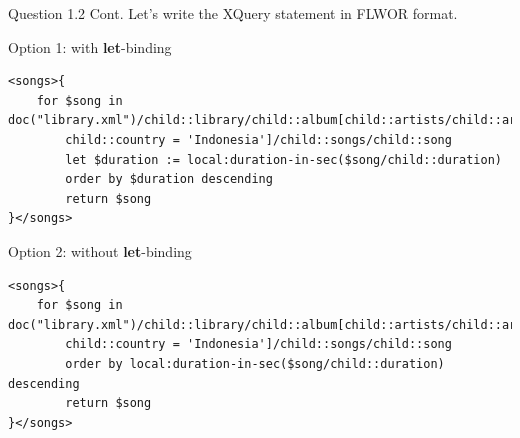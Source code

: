 \begin{frame}[fragile]{Question 1.2 Cont.}
Let's write the XQuery statement in FLWOR format.\\\vspace{5pt}

Option 1: with \textbf{let}-binding\\\vspace{5pt}
\begin{lstlisting}[style=xml-small]
<songs>{
	for $song in doc("library.xml")/child::library/child::album[child::artists/child::artist/
		child::country = 'Indonesia']/child::songs/child::song
		let $duration := local:duration-in-sec($song/child::duration)
		order by $duration descending
		return $song
}</songs>
\end{lstlisting}

Option 2: without \textbf{let}-binding\\\vspace{5pt}
\begin{lstlisting}[style=xml-small]
<songs>{
	for $song in doc("library.xml")/child::library/child::album[child::artists/child::artist/
		child::country = 'Indonesia']/child::songs/child::song
		order by local:duration-in-sec($song/child::duration) descending
		return $song
}</songs>
\end{lstlisting}

\end{frame}

